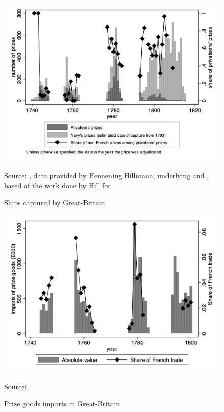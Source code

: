 \documentclass[12pt,a4paper,notitlepage,english]{article}
\newcommand{\source}[1]{\caption*{\footnotesize Source: {#1}} }
\begin{document}
\begin{center}
	\begin{figure}[H]
		\caption{Ships captured by Great-Britain}
		\label{Prizes}
		\centering
		\includegraphics[scale=0.7]{Prizes.png}
		\source{\cite{Starkey1990}, data provided by Hennening Hillmann, underlying \cite{Hillmann2011} and  \cite{Benjamin2009}, based of the work done by Hill for \cite{Hill1998}}
	\end{figure}
\end{center}

\begin{center}
	\begin{figure}[H]
		\caption{Prize goods imports in Great-Britain}
		\label{Prize goods imports}
		\centering
		\includegraphics[scale=0.7]{Prizes_imports.png}
		\source{\cite{Ashton1960}}
	\end{figure}
\end{center}
\end{document}
